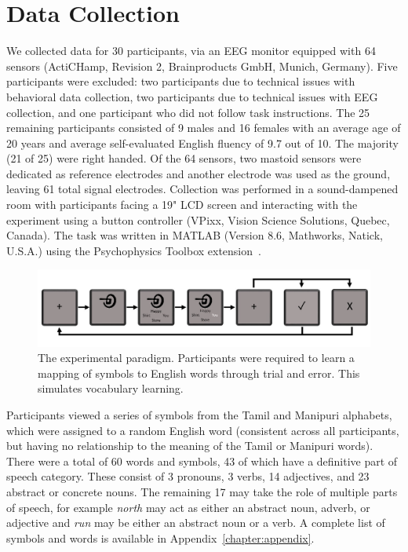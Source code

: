\section{Data Collection}

We collected data for 30 participants, via an EEG monitor equipped with 64 
sensors (ActiCHamp, Revision 2, Brainproducts GmbH, Munich, Germany). Five 
participants were excluded: two participants due to technical issues with 
behavioral data collection, two participants due to technical issues with EEG 
collection, and one participant who did not follow task instructions. The 25 
remaining participants consisted of 9 males and 16 females with an average age 
of 20 years and average self-evaluated English fluency of 9.7 out of 10.  The 
majority (21 of 25) were right handed. Of the 64 sensors, two mastoid sensors 
were dedicated as reference electrodes and another electrode was used as the 
ground, leaving 61 total signal electrodes.  Collection was performed in a 
sound-dampened room with participants facing a 19" LCD screen and interacting 
with the experiment using a button controller (VPixx, Vision Science Solutions, 
Quebec, Canada).  The task was written in MATLAB (Version 8.6, Mathworks, 
Natick, U.S.A.) using the Psychophysics Toolbox 
extension~\cite{brainard1997psychophysics}.


\begin{figure}[t]
  \centering
  \includegraphics[width=\linewidth]{figures/experiment}
  \caption[Experiment Paradigm]{
    The experimental paradigm. Participants were required to learn a mapping of 
    symbols to English words through trial and error. This simulates vocabulary 
    learning.
  }
  \label{fig:experiment}
\end{figure}

Participants viewed a series of symbols from the Tamil and Manipuri alphabets, 
which were assigned to a random English word (consistent across all 
participants, but having no relationship to the meaning of the Tamil or 
Manipuri words). There were a total of 60 words and symbols, 43 of which have a 
definitive part of speech category. These consist of 3 pronouns, 3 verbs, 14 
adjectives, and 23 abstract or concrete nouns. The remaining 17 may take the 
role of multiple parts of speech, for example \emph{north} may act as either an 
abstract noun, adverb, or adjective and \emph{run} may be either an abstract 
noun or a verb. A complete list of symbols and words is available in 
Appendix~\ref{chapter:appendix}.

